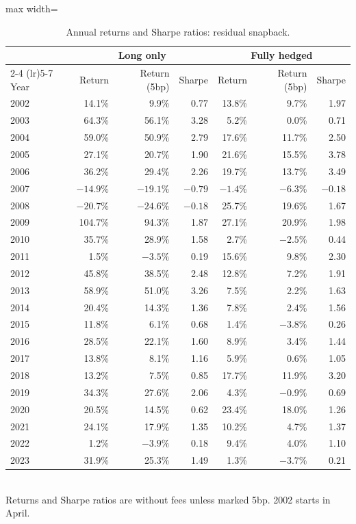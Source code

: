 \documentclass[11pt,letterpaper]{article}
\begin{document}
\begin{table}[!htbp]
\centering
\caption{Annual returns and Sharpe ratios: residual snapback.}
\label{tab:yearly-snap}
\begin{adjustbox}{max width=\linewidth}
\begin{tabular}{lrrrrrr}
\toprule
& \multicolumn{3}{c}{Long only} & \multicolumn{3}{c}{Fully hedged} \\
\cmidrule(lr){2-4} \cmidrule(lr){5-7}
Year & Return & Return (5bp) & Sharpe & Return & Return (5bp) & Sharpe \\
\midrule
2002 & 14.1\% & 9.9\% & 0.77 & 13.8\% & 9.7\% & 1.97 \\
2003 & 64.3\% & 56.1\% & 3.28 & 5.2\% & 0.0\% & 0.71 \\
2004 & 59.0\% & 50.9\% & 2.79 & 17.6\% & 11.7\% & 2.50 \\
2005 & 27.1\% & 20.7\% & 1.90 & 21.6\% & 15.5\% & 3.78 \\
2006 & 36.2\% & 29.4\% & 2.26 & 19.7\% & 13.7\% & 3.49 \\
2007 & $-14.9\%$ & $-19.1\%$ & $-0.79$ & $-1.4\%$ & $-6.3\%$ & $-0.18$ \\
2008 & $-20.7\%$ & $-24.6\%$ & $-0.18$ & 25.7\% & 19.6\% & 1.67 \\
2009 & 104.7\% & 94.3\% & 1.87 & 27.1\% & 20.9\% & 1.98 \\
2010 & 35.7\% & 28.9\% & 1.58 & 2.7\% & $-2.5\%$ & 0.44 \\
2011 & 1.5\% & $-3.5\%$ & 0.19 & 15.6\% & 9.8\% & 2.30 \\
2012 & 45.8\% & 38.5\% & 2.48 & 12.8\% & 7.2\% & 1.91 \\
2013 & 58.9\% & 51.0\% & 3.26 & 7.5\% & 2.2\% & 1.63 \\
2014 & 20.4\% & 14.3\% & 1.36 & 7.8\% & 2.4\% & 1.56 \\
2015 & 11.8\% & 6.1\% & 0.68 & 1.4\% & $-3.8\%$ & 0.26 \\
2016 & 28.5\% & 22.1\% & 1.60 & 8.9\% & 3.4\% & 1.44 \\
2017 & 13.8\% & 8.1\% & 1.16 & 5.9\% & 0.6\% & 1.05 \\
2018 & 13.2\% & 7.5\% & 0.85 & 17.7\% & 11.9\% & 3.20 \\
2019 & 34.3\% & 27.6\% & 2.06 & 4.3\% & $-0.9\%$ & 0.69 \\
2020 & 20.5\% & 14.5\% & 0.62 & 23.4\% & 18.0\% & 1.26 \\
2021 & 24.1\% & 17.9\% & 1.35 & 10.2\% & 4.7\% & 1.37 \\
2022 & 1.2\% & $-3.9\%$ & 0.18 & 9.4\% & 4.0\% & 1.10 \\
2023 & 31.9\% & 25.3\% & 1.49 & 1.3\% & $-3.7\%$ & 0.21 \\
\bottomrule
\end{tabular}
\end{adjustbox}
\\[4pt]
\small Returns and Sharpe ratios are without fees unless marked 5bp. 2002 starts in April.
\end{table}
\end{document}
